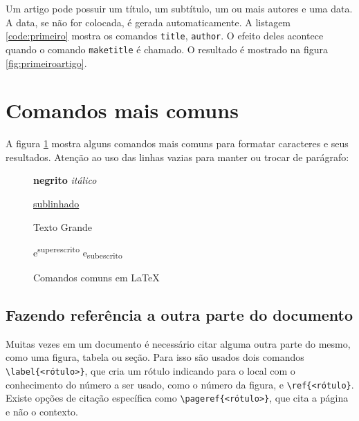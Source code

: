 Um artigo pode possuir um título, um subtítulo, um ou mais autores e uma data. A data, se não for colocada, é gerada automaticamente. A listagem \ref{code:primeiro} mostra os comandos \lstinline|title|, \lstinline|author|. O efeito deles acontece quando o comando \lstinline|maketitle| é chamado. O resultado é mostrado na figura \ref{fig:primeiroartigo}.

\section{Comandos mais comuns}

A figura \ref{fig:com:comum} mostra alguns comandos mais comuns para
formatar caracteres e seus resultados. Atenção ao uso das
linhas vazias para manter ou trocar de parágrafo:

\begin{figure}[hbt]
    \begin{LTXexample}[pos=b]
\textbf{negrito} 
\textit{itálico}

\underline{sublinhado}

\Large
Texto Grande
\normalsize

e\textsuperscript{superescrito}
e\textsubscript{subescrito}
    \end{LTXexample}
    \caption{Comandos comuns em \LaTeX}
    \label{fig:com:comum}
\end{figure}

\subsection{Fazendo referência a outra parte do documento}

Muitas vezes em um documento é necessário citar alguma outra parte do mesmo, como uma figura, tabela ou seção. Para isso são usados dois comandos \lstinline|\label{<rótulo>}|, que cria um rótulo indicando para o local com o conhecimento do número a ser usado, como o número da figura, e \lstinline|\ref{<rótulo}|. Existe opções de citação específica como \lstinline|\pageref{<rótulo>}|, que cita a página e não o contexto.



